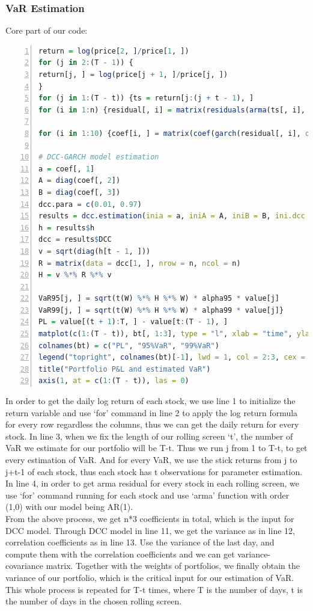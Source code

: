     \subsubsection{VaR Estimation}
    \noindent Core part of our code:\\
    \begin{lstlisting}[language=R,numbers=left, numberstyle=\normalsize]
return = log(price[2, ]/price[1, ])
for (j in 2:(T - 1)) {
return[j, ] = log(price[j + 1, ]/price[j, ])
}
for (j in 1:(T - t)) {ts = return[j:(j + t - 1), ]
for (i in 1:n) {residual[, i] = matrix(residuals(arma(ts[, i], order = c(1, 0))))}

for (i in 1:10) {coef[i, ] = matrix(coef(garch(residual[, i], order = c(1, 1), series = NULL)))}

# DCC-GARCH model estimation
a = coef[, 1]
A = diag(coef[, 2])
B = diag(coef[, 3])
dcc.para = c(0.01, 0.97)
results = dcc.estimation(inia = a, iniA = A, iniB = B, ini.dcc = dcc.para, dvar = residual, model =       "diagonal")
h = results$h
dcc = results$DCC
v = sqrt(diag(h[t - 1, ]))
R = matrix(data = dcc[1, ], nrow = n, ncol = n)
H = v %*% R %*% v

VaR95[j, ] = sqrt(t(W) %*% H %*% W) * alpha95 * value[j]
VaR99[j, ] = sqrt(t(W) %*% H %*% W) * alpha99 * value[j]}
PL = value[(t + 1):T, ] - value[t:(T - 1), ]
matplot(c(1:(T - t)), bt[, 1:3], type = "l", xlab = "time", ylab = "P&L", xaxt = "n")
colnames(bt) = c("PL", "95%VaR", "99%VaR")
legend("topright", colnames(bt)[-1], lwd = 1, col = 2:3, cex = 0.75)
title("Portfolio P&L and estimated VaR")
axis(1, at = c(1:(T - t)), las = 0)
    \end{lstlisting}
    In order to get the daily log return of each stock, we use line 1 to initialize the return variable and use `for' command in line 2 to apply the log return formula for every row regardless the columns, thus we can get the daily return for every stock. In line 3, when we fix the length of our rolling screen `t', the number of VaR we estimate for our portfolio will be T-t. Thus we run j from 1 to T-t, to get every estimation of VaR. And for every VaR, we use the stick returns from j to j+t-1 of each stock, thus each stock has t observations for parameter estimation. In line 4, in order to get arma residual for every stock in each rolling screen, we use `for' command running for each stock and use `arma' function with order (1,0) with our model being AR(1).\\
    [\baselineskip]\indent From the above process, we get n*3 coefficients in total, which is the input for DCC model. Through DCC model in line 11, we get the variance as in line 12, correlation coefficients as in line 13. Use the variance of the last day, and compute them with the correlation coefficients and we can get variance-covariance matrix. Together with the weights of portfolios, we finally obtain the variance of our portfolio, which is the critical input for our estimation of VaR. This whole process is repeated for T-t times, where T is the number of days, t is the number of days in the chosen rolling screen.\\
